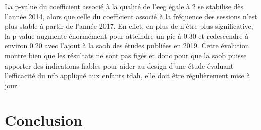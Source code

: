 La p-value du coefficient associé à la qualité de l'\gls{eeg} égale à 2 se stabilise dès l'année 2014, alors que celle du coefficient associé à la fréquence des sessions 
n'est plus stable à partir de l'année 2017. En effet, en plus de n'être plus significative, la p-value augmente énormément pour atteindre un pic à 0.30 et redescendre à environ 0.20
avec l'ajout à la \gls{saob} des études publiées en 2019. Cette évolution montre bien que les résultats ne sont pas figés et donc pour que la \gls{saob} puisse apporter des indications
fiables pour aider au design d'une étude évaluant l'efficacité du \gls{nfb} appliqué aux enfants \gls{tdah}, elle doit être régulièrement mise à jour. 

\section{Conclusion}






 